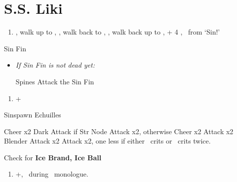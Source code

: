 \chapter{S.S. Liki}

\begin{enumerate}
    \item \cs[2:00], walk up to \yuna, \sd, walk back to \wakka, \sd, walk back up to \yuna, \cs + 4 \skippablefmv[4:20], \sd\ from `Sin!'
\end{enumerate}
\begin{battle}[2000]{Sin Fin}
    \begin{itemize}
        \tidusf Defend
        \switch{\yuna}{\lulu}
        \luluf Thunder the Sin Fin
        \switch{\kimahri}{\yuna}
        \summon{\valefor}
        \valeforf Energy Ray \od\ on Sin Fin
        \enemyf Move x2 and Spines x2
        \valeforf Thunder the Sin Fin
        \enemyf Spines and Move
        \valeforf Thunder the Sin Fin x2
        \item \textit{If Sin Fin is not dead yet:}
        \begin{itemize}
            \enemyf Spines
            \switch{\tidus}{\wakka}
            \wakkaf Attack the Sin Fin
        \end{itemize}
    \end{itemize}
\end{battle}
\begin{enumerate}[resume]
    \item \fmv+\cs[1:40]
\end{enumerate}
\begin{battle}[2000]{Sinspawn Echuilles}
    \begin{itemize}
        \tidusf Cheer x2
        \wakkaf Dark Attack
        \tidusf if Str Node Attack x2, otherwise Cheer x2
        \wakkaf Attack x2
        \enemyf Blender
        \wakkaf Attack x2
        \tidusf Attack x2, one less if either \tidus\ crits or \wakka\ crits twice.
        \tidusf \od
    \end{itemize}
    Check for \textbf{Ice Brand, Ice Ball}
\end{battle}
\begin{enumerate}[resume]
    \item \skippablefmv+\cs[1:30], \sd\ during \tidus\ monologue.
\end{enumerate}